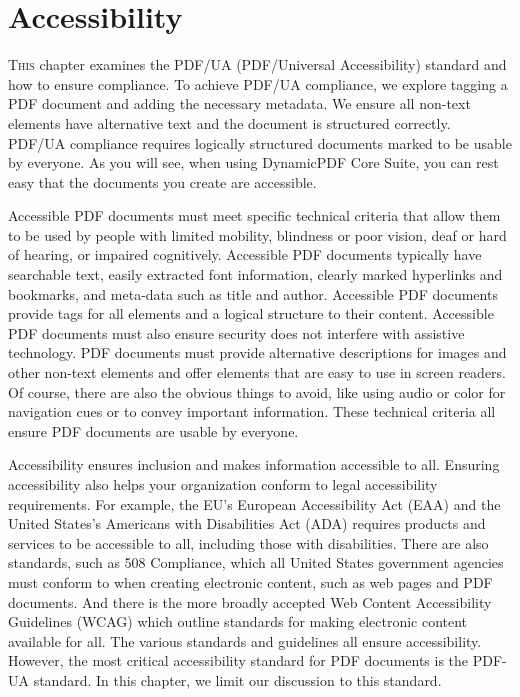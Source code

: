 \documentclass[american]{tufte-book}
\numberwithin{equation}{section}
\numberwithin{figure}{section}
\def\color#1{}%
\begin{document}
{{\chapter{Accessibility}\label{chap:Accessibility}
\color{black}
\BgThispage
\vspace{8.00em}
\lettrine[lines=2,lhang=0.1]{T}{his} chapter examines the PDF/UA (PDF/Universal Accessibility) standard
and how to ensure compliance. To achieve PDF/UA
compliance, we explore tagging a PDF document and adding the necessary
metadata. We ensure all non-text elements have alternative text and
the document is structured correctly. PDF/UA compliance
requires logically structured documents marked to be usable
by everyone. As you will see, when using DynamicPDF Core Suite,
you can rest easy that the documents you create are accessible.

Accessible PDF documents must meet specific technical criteria that
allow them to be used by people with limited
mobility, blindness or poor vision, deaf or hard of hearing, or impaired
cognitively. Accessible PDF documents typically have searchable text,
easily extracted font information, clearly marked hyperlinks and bookmarks,
and meta-data such as title and author. Accessible PDF documents provide
tags for all elements and a logical structure to their content.
Accessible PDF documents must also ensure security does not interfere
with assistive technology. PDF documents must provide alternative
descriptions for images and other non-text elements and offer elements that are easy to use in screen readers. Of course,
there are also the obvious things to avoid, like using audio or color
for navigation cues or to convey important information. These technical
criteria all ensure PDF documents are usable by everyone.

Accessibility ensures inclusion and makes information accessible to
all. Ensuring accessibility also helps your organization conform to
legal accessibility requirements. For example, the EU’s European Accessibility
Act (EAA) and the United States’s Americans with Disabilities Act
(ADA) requires products and services to be accessible to all, including
those with disabilities. There are also standards, such as 508 Compliance,
which all United States government agencies must conform to when creating
electronic content, such as web pages and PDF documents. And there
is the more broadly accepted Web Content Accessibility Guidelines
(WCAG) which outline standards for making electronic content available
for all. The various standards and guidelines all ensure accessibility.
However, the most critical accessibility standard for PDF documents is
the PDF-UA standard. In this chapter, we limit our discussion to this
standard.

}}
\end{document}
